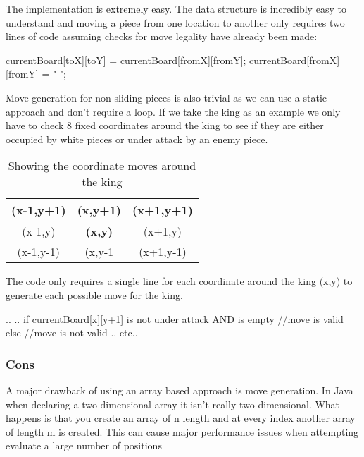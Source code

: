 \documentclass[11pt]{report}
\begin{document}
The implementation is extremely easy. The data structure is incredibly easy to understand and moving a piece from one location to another only requires two lines of code assuming checks for move legality have already been made:

\begin{flushleft}
{\large currentBoard[toX][toY] = currentBoard[fromX][fromY];\newline
currentBoard[fromX][fromY] = " ";}
\end{flushleft}

Move generation for non sliding pieces is also trivial as we can use a static approach and don't require a loop. If we take the king as an example we only have to check 8 fixed coordinates around the king to see if they are either occupied by white pieces or under attack by an enemy piece.

\begin{table}[H]
\centering
\begin{tabular}{|c|c|c|}
\hline
(x-1,y+1) & (x,y+1)        & (x+1,y+1) \\ \hline
(x-1,y)   & \textbf{(x,y)} & (x+1,y)   \\ \hline
(x-1,y-1) & (x,y-1         & (x+1,y-1) \\ \hline
\end{tabular}
\caption{Showing the coordinate moves around the king}
\end{table}

The code only requires a single line for each coordinate around the king (x,y) to generate each possible move for the king.

\begin{flushleft}
..\newline
..\newline
{\Large if currentBoard[x][y+1] is not under attack AND is empty \newline
//move is valid \newline
else \newline
     //move is not valid}
..
etc..
\end{flushleft}


\subsubsection{Cons}

A major drawback of using an array based approach is move generation. In Java when declaring a two dimensional array it isn't really two dimensional. What happens is that you create an array of n length and at every index another array of length m is created. This can cause major performance issues when attempting evaluate a large number of positions
\end{document}
